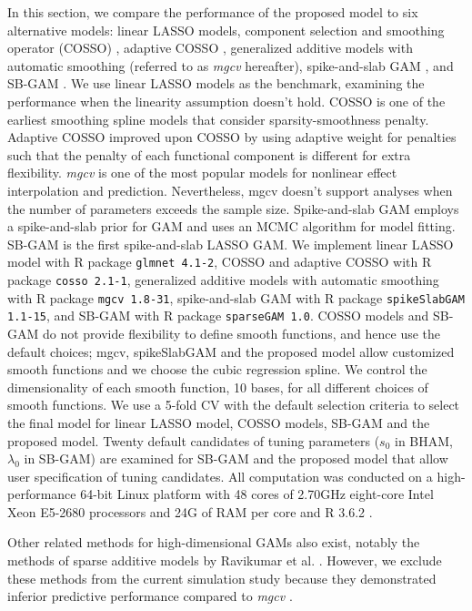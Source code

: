 \documentclass[AMA,STIX1COL,]{WileyNJD-v2}
\begin{document}
In this section, we compare the performance of the proposed model to six
alternative models: linear LASSO models, component selection and
smoothing operator (COSSO) \citep{Zhang2006GAM}, adaptive COSSO
\citep{Storlie2011}, generalized additive models with automatic
smoothing (referred to as \textit{mgcv} hereafter)\citep{Wood2011},
spike-and-slab GAM \cite{Scheipl2012}, and SB-GAM \citep{Bai2021}. We
use linear LASSO models as the benchmark, examining the performance when
the linearity assumption doesn't hold. COSSO is one of the earliest
smoothing spline models that consider sparsity-smoothness penalty.
Adaptive COSSO improved upon COSSO by using adaptive weight for
penalties such that the penalty of each functional component is
different for extra flexibility. \textit{mgcv} is one of the most
popular models for nonlinear effect interpolation and prediction.
Nevertheless, mgcv doesn't support analyses when the number of
parameters exceeds the sample size. Spike-and-slab GAM employs a
spike-and-slab prior for GAM and uses an MCMC algorithm for model
fitting. SB-GAM is the first spike-and-slab LASSO GAM. We implement
linear LASSO model with R package \texttt{glmnet 4.1-2}, COSSO and
adaptive COSSO with R package \texttt{cosso 2.1-1}, generalized additive
models with automatic smoothing with R package \texttt{mgcv 1.8-31},
spike-and-slab GAM with R package \texttt{spikeSlabGAM 1.1-15}, and
SB-GAM with R package \texttt{sparseGAM 1.0}. COSSO models and SB-GAM do
not provide flexibility to define smooth functions, and hence use the
default choices; mgcv, spikeSlabGAM and the proposed model allow
customized smooth functions and we choose the cubic regression spline.
We control the dimensionality of each smooth function, 10 bases, for all
different choices of smooth functions. We use a 5-fold CV with the
default selection criteria to select the final model for linear LASSO
model, COSSO models, SB-GAM and the proposed model. Twenty default
candidates of tuning parameters (\(s_0\) in BHAM, \(\lambda_0\) in
SB-GAM) are examined for SB-GAM and the proposed model that allow user
specification of tuning candidates. All computation was conducted on a
high-performance 64-bit Linux platform with 48 cores of 2.70GHz
eight-core Intel Xeon E5-2680 processors and 24G of RAM per core and R
3.6.2 \citep{R}.

Other related methods for high-dimensional GAMs also exist, notably the
methods of sparse additive models by Ravikumar et al.
\citep{Ravikumar2009}. However, we exclude these methods from the
current simulation study because they demonstrated inferior predictive
performance compared to \textit{mgcv} \citep{Scheipl2013}.
\end{document}
